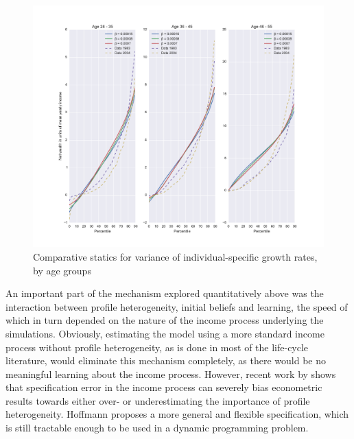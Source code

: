 \begin{figure}
\includegraphics[width=\columnwidth]{comp_stat_beta_agedetail}
\caption{Comparative statics for variance of individual-specific growth rates, by age groups}
\label{fig:comp_stat_beta_agedetail}
\end{figure}


An important part of the mechanism explored quantitatively above was the interaction 
between profile heterogeneity, initial beliefs and learning, the speed of which 
in turn depended on the nature of the income process underlying the simulations. 
Obviously, estimating the model using a more standard income process without 
profile heterogeneity, as is done in most of the life-cycle literature, would 
eliminate this mechanism completely, as there would be no meaningful learning 
about the income process. However, recent work by \citet{Hoffmann2013} shows 
that specification error in the income process can severely bias econometric
 results towards either over- or underestimating the importance of profile 
heterogeneity. Hoffmann proposes a more general and flexible specification, 
which is still tractable enough to be used in a dynamic programming problem.

\pagebreak
